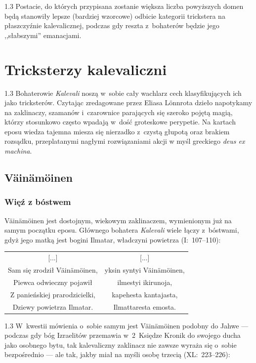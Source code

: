\documentclass[11pt,a4paper,twoside]{report}
\begin{document}
\begin{spacing}{1.3}
Postacie, do których przypisana zostanie większa liczba powyższych domen będą stanowiły lepsze (bardziej wzorcowe) odbicie kategorii trickstera na płaszczyźnie kalevalicznej, podczas gdy reszta z~bohaterów będzie jego ,,słabszymi'' emanacjami.
\end{spacing}

\chapter{Tricksterzy kalevaliczni}
\begin{spacing}{1.3}
Bohaterowie \emph{Kalevali} noszą w~sobie cały wachlarz cech klasyfikujących ich jako tricksterów. Czytając zredagowane przez Eliasa Lönnrota dzieło napotykamy na zaklinaczy, szamanów i~czarownice parających się szeroko pojętą magią, którzy stosunkowo często wpadają w~dość groteskowe perypetie. Na kartach eposu wiedza tajemna miesza się nierzadko z~czystą głupotą oraz brakiem rozsądku, przeplatanymi nagłymi rozwiązaniami akcji w myśl greckiego \emph{deus ex machina}.

\section{Väinämöinen}
\vspace*{0.5\baselineskip}
\subsection*{Więź z bóstwem}

Väinämöinen jest dostojnym, wiekowym zaklinaczem, wymienionym już na samym początku eposu. Głównego bohatera \emph{Kalevali} wiele łączy z~bóstwami, gdyż jego matką jest bogini Ilmatar, władczyni powietrza (I:~107--110):
\end{spacing}
{\centering
\small
\begin{longtable}{c c}
[...]                         & [...] \\
Sam się zrodził Väinämöinen,  & yksin syntyi Väinämöinen, \\
Piewca odwieczny pojawił      & ilmestyi ikirunoja, \\
Z panieńskiej prarodzicielki, & kapehesta kantajasta, \\
Dziewy powietrza Ilmatar.     & Ilmattaresta emosta. \\
\end{longtable}
}
\begin{spacing}{1.3}
W~kwestii mówienia o~sobie samym jest Väinämöinen podobny do Jahwe --- podczas gdy bóg Izraelitów przemawia w~2~Księdze Kronik do swojego ducha jako osobnego bytu, tak kalevaliczny zaklinacz nie zawsze wyraża się o~sobie bezpośrednio --- ale tak, jakby miał na myśli osobę trzecią (XL:~223--226):
\end{spacing}
\end{document}
